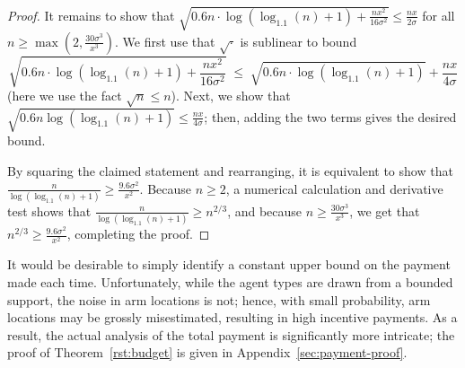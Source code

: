 \begin{proof}
It remains to show that
$\sqrt{0.6 n \cdot \log (\log_{1.1}(n) + 1) + \frac{n x^2}{16 \sigma^2}}
\leq \frac{n x}{2 \sigma}$
for all $n \geq \max(2, \frac{30 \sigma^3}{x^3})$.
We first use that $\sqrt{\cdot}$ is sublinear to bound
\[
  \sqrt{0.6 n \cdot \log (\log_{1.1}(n) + 1) + \frac{n x^2}{16 \sigma^2}}
\; \leq \; \sqrt{0.6 n \cdot \log (\log_{1.1}(n) + 1)} + \frac{n x}{4 \sigma}
\]
(here we use the fact $\sqrt{n} \leq n$).
Next, we show that
$\sqrt{0.6 n \log (\log_{1.1}(n) + 1)} \leq \frac{n x}{4 \sigma}$;
then, adding the two terms gives the desired bound.

By squaring the claimed statement and rearranging,
it is equivalent to show that
$\frac{n}{\log(\log_{1.1}(n)+1)} \geq \frac{9.6\sigma^2}{x^2}$.
Because $n \geq 2$,
a numerical calculation and derivative test shows that
$\frac{n}{\log(\log_{1.1}(n)+1)} \geq n^{2/3}$,
and because $n \geq \frac{30 \sigma^3}{x^3}$,
we get that
$n^{2/3} \geq \frac{9.6 \sigma^2}{x^2}$, completing the proof.
\end{proof}

It would be desirable to simply identify a constant upper bound on the
payment made each time.
Unfortunately, while the agent types are drawn from a bounded support,
the noise in arm locations is not;
hence, with small probability, arm locations may be grossly
misestimated, resulting in high incentive payments.
As a result, the actual analysis of the total payment is significantly more
intricate;
the proof of Theorem~\ref{rst:budget} is given in
Appendix~\ref{sec:payment-proof}.
